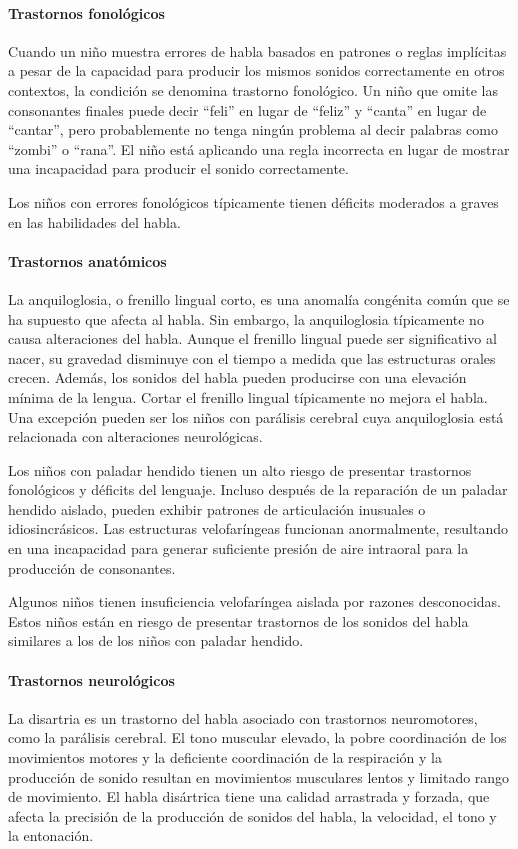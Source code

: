 \documentclass[11pt,letterpaper]{report}
\begin{document}
\paragraph{Trastornos fonológicos}
Cuando un niño muestra errores de habla basados en patrones o reglas
implícitas a pesar de la capacidad para producir los mismos sonidos
correctamente en otros contextos, la condición se denomina trastorno
fonológico. Un niño que omite las consonantes finales puede decir ``feli'' en
lugar de ``feliz'' y ``canta'' en lugar de ``cantar'', pero probablemente no
tenga ningún problema al decir palabras como ``zombi'' o ``rana''. El niño está
aplicando una regla incorrecta en lugar de mostrar una incapacidad para
producir el sonido correctamente. \cite{Feldman44}

Los niños con errores fonológicos típicamente tienen déficits moderados a
graves en las habilidades del habla.

\paragraph{Trastornos anatómicos}
La anquiloglosia, o frenillo lingual corto, es una anomalía congénita común
que se ha supuesto que afecta al habla. Sin embargo, la anquiloglosia
típicamente no causa alteraciones del habla. Aunque el frenillo lingual puede
ser significativo al nacer, su gravedad disminuye con el tiempo a medida que
las estructuras orales crecen. Además, los sonidos del habla pueden producirse
con una elevación mínima de la lengua. Cortar el frenillo lingual
típicamente no mejora el habla. Una excepción pueden ser los niños con
parálisis cerebral cuya anquiloglosia está relacionada con alteraciones
neurológicas. \cite{Feldman44}

Los niños con paladar hendido tienen un alto riesgo de presentar trastornos
fonológicos y déficits del lenguaje. Incluso después de la reparación de un
paladar hendido aislado, pueden exhibir patrones de articulación inusuales o
idiosincrásicos. Las estructuras velofaríngeas funcionan anormalmente,
resultando en una incapacidad para generar suficiente presión de aire
intraoral para la producción de consonantes. \cite{Feldman44}

Algunos niños tienen insuficiencia velofaríngea aislada por razones
desconocidas. Estos niños están en riesgo de presentar trastornos de los
sonidos del habla similares a los de los niños con paladar hendido.
\cite{Feldman44}

\paragraph{Trastornos neurológicos}
La disartria es un trastorno del habla asociado con trastornos neuromotores,
como la parálisis cerebral. El tono muscular elevado, la pobre coordinación de
los movimientos motores y la deficiente coordinación de la respiración y la
producción de sonido resultan en movimientos musculares lentos y limitado rango
de movimiento. El habla disártrica tiene una calidad arrastrada y forzada, que
afecta la precisión de la producción de sonidos del habla, la velocidad, el
tono y la entonación. \cite{Feldman44}
\end{document}
